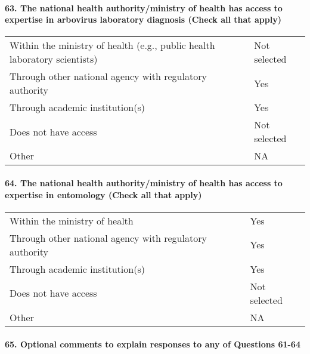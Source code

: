 \documentclass[
]{article}
\begin{document}
\hypertarget{the-national-health-authorityministry-of-health-has-access-to-expertise-in-arbovirus-laboratory-diagnosis-check-all-that-apply}{%
\paragraph{63. The national health authority/ministry of health has
access to expertise in arbovirus laboratory diagnosis (Check all that
apply)}\label{the-national-health-authorityministry-of-health-has-access-to-expertise-in-arbovirus-laboratory-diagnosis-check-all-that-apply}}

\begin{longtable}[]{@{}
  >{\raggedright\arraybackslash}p{}
  >{\raggedright\arraybackslash}p{}@{}}
\toprule
\endhead
Within the ministry of health (e.g., public health laboratory
scientists) & Not selected \\
Through other national agency with regulatory authority & Yes \\
Through academic institution(s) & Yes \\
Does not have access & Not selected \\
Other & NA \\
\bottomrule
\end{longtable}

\hypertarget{the-national-health-authorityministry-of-health-has-access-to-expertise-in-entomology-check-all-that-apply}{%
\paragraph{64. The national health authority/ministry of health has
access to expertise in entomology (Check all that
apply)}\label{the-national-health-authorityministry-of-health-has-access-to-expertise-in-entomology-check-all-that-apply}}

\begin{longtable}[]{@{}ll@{}}
\toprule
\endhead
Within the ministry of health & Yes \\
Through other national agency with regulatory authority & Yes \\
Through academic institution(s) & Yes \\
Does not have access & Not selected \\
Other & NA \\
\bottomrule
\end{longtable}

\hypertarget{optional-comments-to-explain-responses-to-any-of-questions-61-64}{%
\paragraph{65. Optional comments to explain responses to any of
Questions
61-64}\label{optional-comments-to-explain-responses-to-any-of-questions-61-64}}
\end{document}
